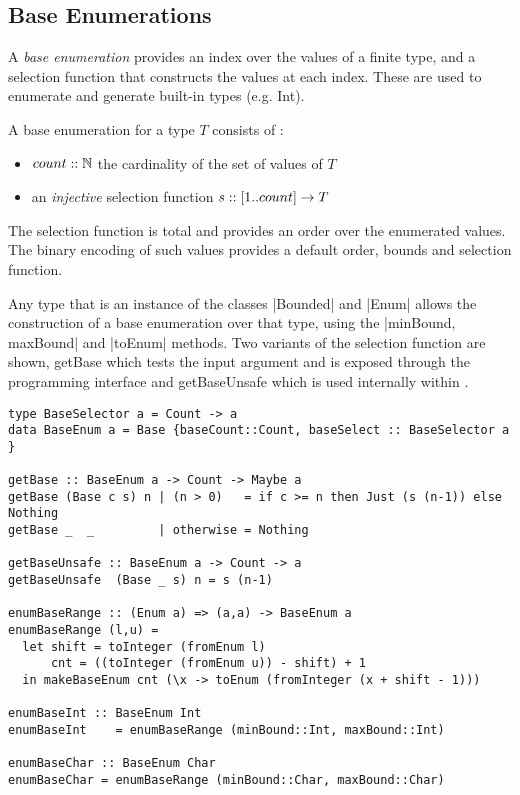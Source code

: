

\subsection{Base Enumerations}

A \emph{base enumeration} provides an index over the values of a finite type,
and a selection function that constructs the values at each index.
These are used to enumerate and generate built-in types (e.g. Int).

\begin{df}

A base enumeration for a type $T$ consists of :
\begin{itemize}
\item $count :: \mathbb{N}$ the cardinality of the set of values of $T$
\item an \emph{injective} selection function $s :: [1 .. count] \rightarrow T$
\end{itemize}

\end{df}

\noindent
The selection function is total 
and provides an order over the enumerated values.
The binary encoding of such values 
provides a default order, bounds and selection function.

Any type that is an instance of the classes |Bounded| and |Enum|
allows the construction of a base enumeration over that type,
using the |minBound, maxBound| and |toEnum| methods.
Two variants of the selection function are shown,
getBase which tests the input argument and is exposed through the programming interface
and getBaseUnsafe which is used internally within \GC.

\begin{lstlisting}
type BaseSelector a = Count -> a
data BaseEnum a = Base {baseCount::Count, baseSelect :: BaseSelector a }

getBase :: BaseEnum a -> Count -> Maybe a
getBase (Base c s) n | (n > 0)   = if c >= n then Just (s (n-1)) else Nothing
getBase _  _         | otherwise = Nothing

getBaseUnsafe :: BaseEnum a -> Count -> a
getBaseUnsafe  (Base _ s) n = s (n-1)

enumBaseRange :: (Enum a) => (a,a) -> BaseEnum a
enumBaseRange (l,u) = 
  let shift = toInteger (fromEnum l)
      cnt = ((toInteger (fromEnum u)) - shift) + 1
  in makeBaseEnum cnt (\x -> toEnum (fromInteger (x + shift - 1)))

enumBaseInt :: BaseEnum Int
enumBaseInt    = enumBaseRange (minBound::Int, maxBound::Int)

enumBaseChar :: BaseEnum Char
enumBaseChar = enumBaseRange (minBound::Char, maxBound::Char)

\end{lstlisting}

